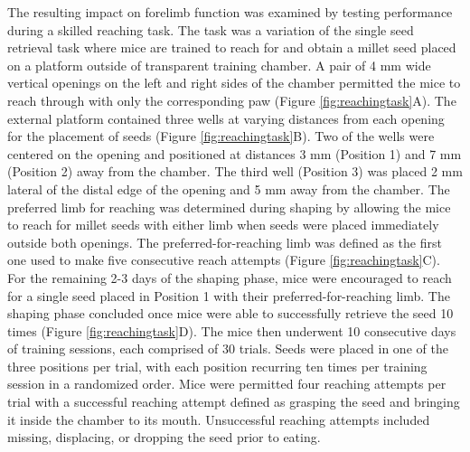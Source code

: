 The resulting impact on forelimb function was examined by testing performance during a skilled reaching task. The task was a variation of the single seed retrieval task \cite{Chen:2014hy} where mice are trained to reach for and obtain a millet seed placed on a platform outside of transparent training chamber. A pair of 4 mm wide vertical openings on the left and right sides of the chamber permitted the mice to reach through with only the corresponding paw (Figure \ref{fig:reachingtask}A). The external platform contained three wells at varying distances from each opening for the placement of seeds (Figure \ref{fig:reachingtask}B). Two of the wells were centered on the opening and positioned at distances 3 mm (Position 1) and 7 mm (Position 2) away from the chamber. The third well (Position 3) was placed 2 mm lateral of the distal edge of the opening and 5 mm away from the chamber. The preferred limb for reaching was determined during shaping by allowing the mice to reach for millet seeds with either limb when seeds were placed immediately outside both openings. The preferred-for-reaching limb was defined as the first one used to make five consecutive reach attempts (Figure \ref{fig:reachingtask}C). For the remaining 2-3 days of the shaping phase, mice were encouraged to reach for a single seed placed in Position 1 with their preferred-for-reaching limb. The shaping phase concluded once mice were able to successfully retrieve the seed 10 times (Figure \ref{fig:reachingtask}D). The mice then underwent 10 consecutive days of training sessions, each comprised of 30 trials. Seeds were placed in one of the three positions per trial, with each position recurring ten times per training session in a randomized order. Mice were permitted four reaching attempts per trial with a successful reaching attempt defined as grasping the seed and bringing it inside the chamber to its mouth. Unsuccessful reaching attempts included missing, displacing, or dropping the seed prior to eating.

